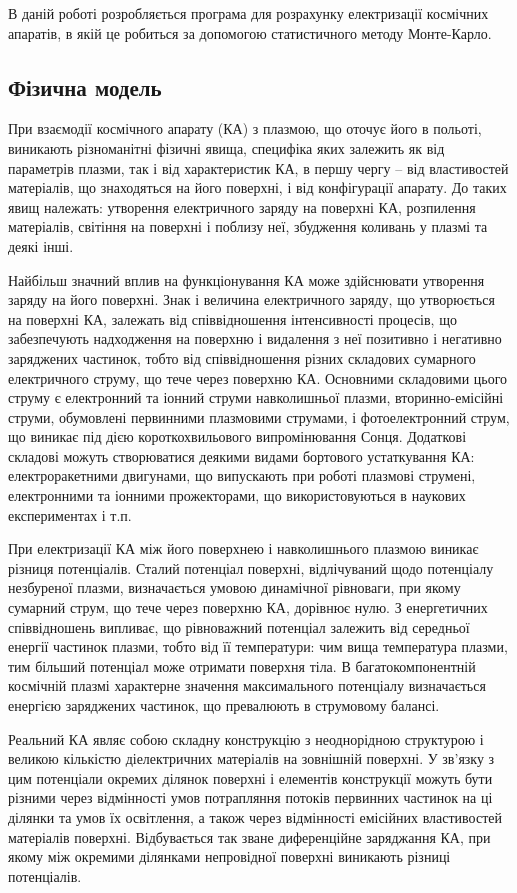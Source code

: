 \documentclass[a4paper,12pt]{article}
\begin{document}
В даній роботі розробляється програма для розрахунку електризації космічних апаратів, в якій це робиться за допомогою статистичного методу Монте-Карло.

\subsection{Фізична модель}
При взаємодії космічного апарату (КА) з плазмою, що оточує його в польоті, виникають різноманітні фізичні явища, специфіка яких залежить як від параметрів плазми, так і від характеристик КА, в першу чергу -- від властивостей матеріалів, що знаходяться на його поверхні, і від конфігурації апарату. До таких явищ належать: утворення електричного заряду на поверхні КА, розпилення матеріалів, світіння на поверхні і поблизу неї, збудження коливань у плазмі та деякі інші.

Найбільш значний вплив на функціонування КА може здійснювати утворення заряду на його поверхні. Знак і величина електричного заряду, що утворюється на поверхні КА, залежать від співвідношення інтенсивності процесів, що забезпечують надходження на поверхню і видалення з неї позитивно і негативно заряджених частинок, тобто від співвідношення різних складових сумарного електричного струму, що тече через поверхню КА. Основними складовими цього струму є електронний та іонний струми навколишньої плазми, вторинно-емісійні струми, обумовлені первинними плазмовими струмами, і фотоелектронний струм, що виникає під дією короткохвильового випромінювання Сонця. Додаткові складові можуть створюватися деякими видами бортового устаткування КА: електроракетними двигунами, що випускають при роботі плазмові струмені, електронними та іонними прожекторами, що використовуються в наукових експериментах і т.п.

При електризації КА між його поверхнею і навколишнього плазмою виникає різниця потенціалів. Сталий потенціал поверхні, відлічуваний щодо потенціалу незбуреної плазми, визначається умовою динамічної рівноваги, при якому сумарний струм, що тече через поверхню КА, дорівнює нулю. З енергетичних співвідношень випливає, що рівноважний потенціал залежить від середньої енергії частинок плазми, тобто від її температури: чим вища температура плазми, тим більший потенціал може отримати поверхня тіла. В багатокомпонентній космічній плазмі характерне значення максимального потенціалу визначається енергією заряджених частинок, що превалюють в струмовому балансі.

Реальний КА являє собою складну конструкцію з неоднорідною структурою і великою кількістю діелектричних матеріалів на зовнішній поверхні. У зв'язку з цим потенціали окремих ділянок поверхні і елементів конструкції можуть бути різними через відмінності умов потрапляння потоків первинних частинок на ці ділянки та умов їх освітлення, а також через відмінності емісійних властивостей матеріалів поверхні. Відбувається так зване диференційне заряджання КА, при якому між окремими ділянками непровідної поверхні виникають різниці потенціалів.
\end{document}
